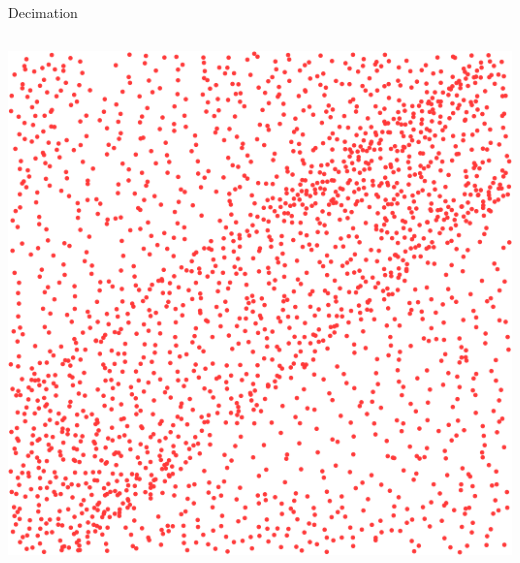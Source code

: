 \documentclass[xcolor={dvipsnames,usenames},beamer,aspectratio=169]{beamer}
\begin{document}
\begin{frame}{Decimation}
\begin{columns}
\begin{column}{0.22\textwidth}
\begin{center}
\smallskip

\includegraphics[width=\textwidth]{features/preserve}

\end{center}

\end{column}
\end{columns}

\end{frame}
\end{document}
